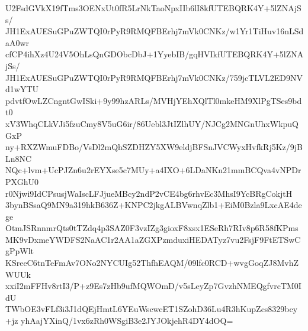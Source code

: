 U2FsdGVkX19fTms3OENxUt0fR5LrNkTaoNpxIIb6lI8kfUTEBQRK4Y+5lZNAjSs/
JH1ExAUESuGPuZWTQI0rPyR9RMQFBErhj7mVk0CNKz/w1Yr1TiHuv16nLSdaA0wr
cfCP4ihXz4U24V5OhLsQnGDObcDbJ+1YyebIB/gqHVIkfUTEBQRK4Y+5lZNAjSs/
JH1ExAUESuGPuZWTQI0rPyR9RMQFBErhj7mVk0CNKz/759jcTLVL2ED9NVd1wYTU
pdvtfOwLZCngntGwISki+9y99hzARLs/MVHjYEhXQlTl0mkeHM9XlPgTSes9bdt0
xV3WhqCLkVJi5fzuCmy8V5uG6ir/86Uebl3JtIZlhUY/NJCg2MNGnUhxWkpuQGxP
ny+RXZWmuFDBo/VsDl2mQhSZDHZY5XW9eldjBFSnJVCWyxHvfkRj5Kz/9jBLn8NC
NQc+lvm+UcPJZn6u2rEYXse5c7MUy+a4IXO+6LDaNKn21mmBCQva4vNPDrPXGhU0
r0Njwi9IdCPsusjWaIscLFJjueMBcy2ndP2vCE4bg6rhvEc3MhsI9YcBRgCokjtH
3bynBSsaQ9MN9a319hkB636Z+KNPC2jkgALBVwnqZlb1+EiM0Bzla9LxcAE4dege
OtmJSRnnmrQts0tTZdq4p3SAZ0F3vzIZg3gioxF8xsx1ESeRh7RIv8p6R58fKPms
MK9vDxmeYWDFS2NaAC1r2AA1aZGXPzmduxiHEDATyz7vu2FsjF9FtETSwCgPpWlt
KSreeC6tnTeFmAv7ONo2NYCUIg52ThfhEAQM/09lfc0RCD+wvgGoqZJ8MvhZWUUk
xxiI2mFFHv8rtI3/P+z9Es7zHb9ufMQWOmD/v5sLeyZp7GvzhNMEQgfvrcTM0IdU
TWbOE3vFLf3i3J1dQEjHmtL6YEuWscwcET1SZohD36Lu4R3hKupZcs8329bcy+jz
yhAajYXinQ/1vx6zRh0WSgiB3e2JYJOkjehR4DY4dOQ=
